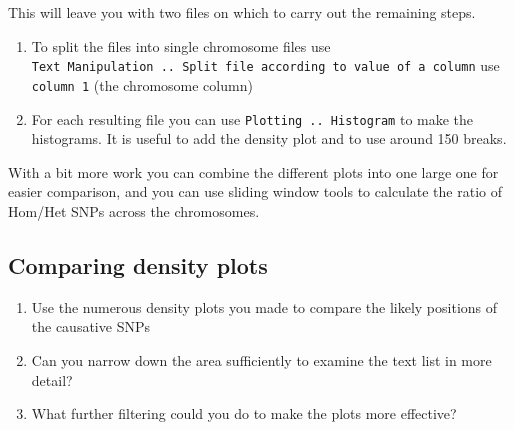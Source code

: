 \documentclass[12pt,]{book}
\providecommand{\tightlist}{%
  \setlength{\itemsep}{0pt}\setlength{\parskip}{0pt}}
\theoremstyle{definition}
\theoremstyle{definition}
\theoremstyle{remark}
\begin{document}
This will leave you with two files on which to carry out the remaining
steps.

\begin{enumerate}
\def\labelenumi{\arabic{enumi}.}
\setcounter{enumi}{4}
\tightlist
\item
  To split the files into single chromosome files use
  \texttt{Text\ Manipulation\ ..\ Split\ file\ according\ to\ value\ of\ a\ column}
  use \texttt{column\ 1} (the chromosome column)
\item
  For each resulting file you can use \texttt{Plotting\ ..\ Histogram}
  to make the histograms. It is useful to add the density plot and to
  use around 150 breaks.
\end{enumerate}

With a bit more work you can combine the different plots into one large
one for easier comparison, and you can use sliding window tools to
calculate the ratio of Hom/Het SNPs across the chromosomes.

\subsection{Comparing density plots}\label{comparing-density-plots}

\begin{enumerate}
\def\labelenumi{\arabic{enumi}.}
\tightlist
\item
  Use the numerous density plots you made to compare the likely
  positions of the causative SNPs
\item
  Can you narrow down the area sufficiently to examine the text list in
  more detail?
\item
  What further filtering could you do to make the plots more effective?
\end{enumerate}


\end{document}
